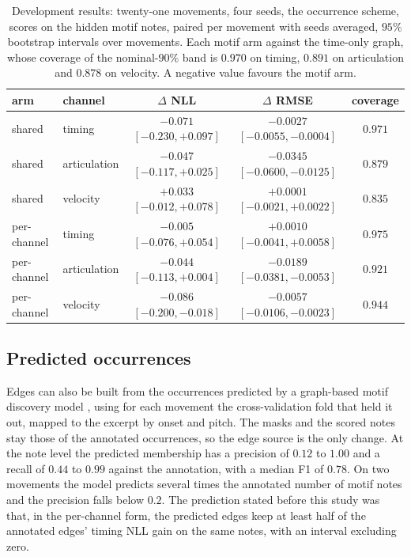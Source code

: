 \documentclass[11pt,a4paper]{report}
\begin{document}
\begin{table}[t]\centering
\caption{Development results: twenty-one movements, four seeds,
the occurrence scheme, scores on the hidden motif notes, paired per
movement with seeds averaged, $95\%$ bootstrap intervals over movements.
Each motif arm against the time-only graph, whose coverage of the
nominal-$90\%$ band is $0.970$ on timing, $0.891$ on articulation and
$0.878$ on velocity. A negative value favours the motif arm.}
\label{tab:motif-dev}
\footnotesize
\begin{tabular}{@{}llccc@{}}
\toprule
arm & channel & $\Delta$ NLL & $\Delta$ RMSE & coverage \\
\midrule
shared & timing & $-0.071$ $[-0.230, +0.097]$ & $-0.0027$ $[-0.0055, -0.0004]$ & $0.971$ \\
shared & articulation & $-0.047$ $[-0.117, +0.025]$ & $-0.0345$ $[-0.0600, -0.0125]$ & $0.879$ \\
shared & velocity & $+0.033$ $[-0.012, +0.078]$ & $+0.0001$ $[-0.0021, +0.0022]$ & $0.835$ \\
per-channel & timing & $-0.005$ $[-0.076, +0.054]$ & $+0.0010$ $[-0.0041, +0.0058]$ & $0.975$ \\
per-channel & articulation & $-0.044$ $[-0.113, +0.004]$ & $-0.0189$ $[-0.0381, -0.0053]$ & $0.921$ \\
per-channel & velocity & $-0.086$ $[-0.200, -0.018]$ & $-0.0057$ $[-0.0106, -0.0023]$ & $0.944$ \\
\bottomrule
\end{tabular}
\end{table}

\subsection{Predicted occurrences}\label{sec:motif-stage2}
Edges can also be built from the occurrences predicted by a graph-based
motif discovery model \cite{lalang2026motif}, using for each
movement the cross-validation fold that held it out, mapped to the excerpt
by onset and pitch. The masks and the scored notes stay those of the
annotated occurrences, so the edge source is the only change. At the note level the
predicted membership has a precision of $0.12$ to $1.00$ and a recall of
$0.44$ to $0.99$ against the annotation, with a median F1 of $0.78$. On two
movements the model predicts several times the annotated number of motif
notes and the precision falls below $0.2$. The prediction stated before
this study was that, in the per-channel form, the predicted edges keep at
least half of the annotated edges' timing NLL gain on the same notes,
with an interval excluding zero.
\end{document}
